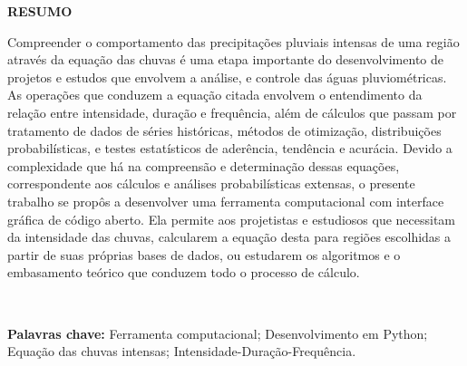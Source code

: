 \thispagestyle{empty}

\singlespacing
\begin{center}
	\textbf{RESUMO}
\end{center}

\noindent Compreender o comportamento das precipitações pluviais intensas de uma região através da equação das chuvas é uma etapa importante do desenvolvimento de projetos e estudos que envolvem a análise, e controle das águas pluviométricas. As operações que conduzem a equação citada envolvem o entendimento da relação entre intensidade, duração e frequência, além de cálculos que passam por tratamento de dados de séries históricas, métodos de otimização, distribuições probabilísticas, e testes estatísticos de aderência, tendência e acurácia. Devido a complexidade que há na compreensão e determinação dessas equações, correspondente aos cálculos e análises probabilísticas extensas, o presente trabalho se propôs a desenvolver uma ferramenta computacional com interface gráfica de código aberto. Ela permite aos projetistas e estudiosos que necessitam da intensidade das chuvas, calcularem a equação desta para regiões escolhidas a partir de suas próprias bases de dados, ou estudarem os algoritmos e o embasamento teórico que conduzem todo o processo de cálculo.

\ \

\noindent \textbf{Palavras chave:} Ferramenta computacional; Desenvolvimento em Python; Equação das chuvas intensas; Intensidade-Duração-Frequência.
\newpage